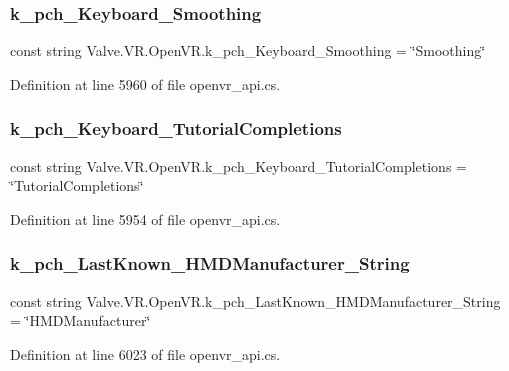 \subsubsection{\texorpdfstring{k\_pch\_Keyboard\_Smoothing}{k\_pch\_Keyboard\_Smoothing}}
{\footnotesize\ttfamily const string Valve.\+V\+R.\+Open\+V\+R.\+k\+\_\+pch\+\_\+\+Keyboard\+\_\+\+Smoothing = \char`\"{}Smoothing\char`\"{}}



Definition at line 5960 of file openvr\+\_\+api.\+cs.

\mbox{\label{class_valve_1_1_v_r_1_1_open_v_r_a1e88453e1532cf5d034d22aa02391819}} 
\subsubsection{\texorpdfstring{k\_pch\_Keyboard\_TutorialCompletions}{k\_pch\_Keyboard\_TutorialCompletions}}
{\footnotesize\ttfamily const string Valve.\+V\+R.\+Open\+V\+R.\+k\+\_\+pch\+\_\+\+Keyboard\+\_\+\+Tutorial\+Completions = \char`\"{}Tutorial\+Completions\char`\"{}}



Definition at line 5954 of file openvr\+\_\+api.\+cs.

\mbox{\label{class_valve_1_1_v_r_1_1_open_v_r_a699d53f228fcf269a3ada1690be006c6}} 
\subsubsection{\texorpdfstring{k\_pch\_LastKnown\_HMDManufacturer\_String}{k\_pch\_LastKnown\_HMDManufacturer\_String}}
{\footnotesize\ttfamily const string Valve.\+V\+R.\+Open\+V\+R.\+k\+\_\+pch\+\_\+\+Last\+Known\+\_\+\+H\+M\+D\+Manufacturer\+\_\+\+String = \char`\"{}H\+M\+D\+Manufacturer\char`\"{}}



Definition at line 6023 of file openvr\+\_\+api.\+cs.

